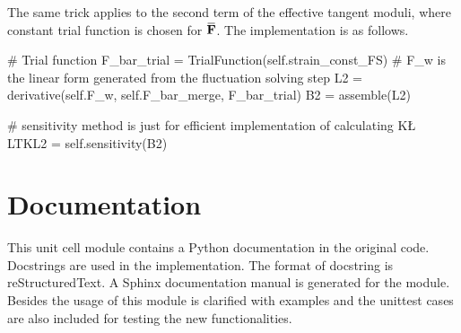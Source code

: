 \documentclass[10pt,a4paper]{scrreprt}
\newcommand{\overbar}[1]{\mkern 1.5mu\overline{\mkern-1.5mu#1\mkern-1.5mu}\mkern 1.5mu}
\begin{document}
The same trick applies to the second term of the effective tangent moduli, where constant trial function is chosen for $\overbar{\mathbf{F}}$. The implementation is as follows. 
\begin{python}
# Trial function
F_bar_trial = TrialFunction(self.strain_const_FS)
# F_w is the linear form generated from the fluctuation solving step
L2 = derivative(self.F_w, self.F_bar_merge, F_bar_trial)
B2 = assemble(L2)

# sensitivity method is just for efficient implementation of calculating K\L
LTKL2 = self.sensitivity(B2)
\end{python}

\section{Documentation}
This unit cell module contains a Python documentation in the original code. Docstrings are used in the implementation. The format of docstring is reStructuredText. A Sphinx documentation manual is generated for the module. Besides the usage of this module is clarified with examples and the unittest cases are also included for testing the new functionalities.
\end{document}
